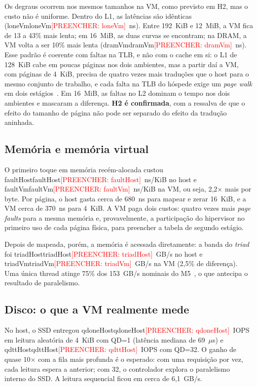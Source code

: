 \documentclass[12pt]{article}
\newcommand{\pend}[1]{\ifmmode\text{\textcolor{red}{[PREENCHER: #1]}}\else\textcolor{red}{[PREENCHER: #1]}\fi}
\newcommand{\val}[1]{\ifcsname #1\endcsname\csname #1\endcsname\else\pend{#1}\fi}
\begin{document}
Os degraus ocorrem nos mesmos tamanhos na VM, como previsto em H2, mas o custo
não é uniforme. Dentro do L1, as latências são idênticas (\val{loneVm}~ns).
Entre 192~KiB e 12~MiB, a VM fica de 13 a 43\% mais lenta; em 16~MiB, as duas
curvas se encontram; na DRAM, a VM volta a ser 10\% mais lenta
(\val{dramVm}~ns). Esse padrão é coerente com faltas na TLB, e não com o cache
em si: o L1 de 128~KiB cabe em poucas páginas nos dois ambientes, mas a partir
daí a VM, com páginas de 4~KiB, precisa de quatro vezes mais traduções que o
host para o mesmo conjunto de trabalho, e cada falta na TLB do hóspede exige um
\emph{page walk} em dois estágios~\cite{bhargava2008}. Em 16~MiB, as faltas no
L2 dominam o tempo nos dois ambientes e mascaram a diferença. \textbf{H2 é
confirmada}, com a ressalva de que o efeito do tamanho de página não pode ser
separado do efeito da tradução aninhada.

\subsection{Memória e memória virtual}

O primeiro toque em memória recém-alocada custou \val{faultHost}~ns/KiB no host
e \val{faultVm}~ns/KiB na VM, ou seja, 2,2$\times$ mais por byte. Por página, o
host gasta cerca de 680~ns para mapear e zerar 16~KiB, e a VM cerca de 370~ns
para 4~KiB. A VM paga dois custos: quatro vezes mais \emph{page faults} para a
mesma memória e, provavelmente, a participação do hipervisor no primeiro uso de cada
página física, para preencher a tabela de segundo estágio.

Depois de mapeada, porém, a memória é acessada diretamente: a banda do
\emph{triad} foi \val{triadHost}~GB/s no host e \val{triadVm}~GB/s na VM
(2,5\% de diferença). Uma única thread atinge 75\% dos 153~GB/s nominais do
M5~\cite{apple2026}, o que antecipa o resultado de paralelismo.

\subsection{Disco: o que a VM realmente mede}
\label{sec:disco}

No host, o SSD entregou \val{qdoneHost}~IOPS em leitura aleatória de 4~KiB com
QD=1 (latência mediana de 69~$\mu$s) e \val{qdttHost}~IOPS com QD=32. O ganho
de quase 10$\times$ com a fila mais profunda é o esperado: com uma requisição
por vez, cada leitura espera a anterior; com 32, o controlador explora o
paralelismo interno do SSD. A leitura sequencial ficou em cerca de 6,1~GB/s.
\end{document}
